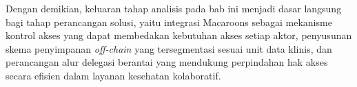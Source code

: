 Dengan demikian, keluaran tahap analisis pada bab ini menjadi dasar langsung bagi tahap perancangan solusi, yaitu integrasi Macaroons sebagai mekanisme kontrol akses yang dapat membedakan kebutuhan akses setiap aktor, penyusunan skema penyimpanan \textit{off-chain} yang tersegmentasi sesuai unit data klinis, dan perancangan alur delegasi berantai yang mendukung perpindahan hak akses secara efisien dalam layanan kesehatan kolaboratif.
